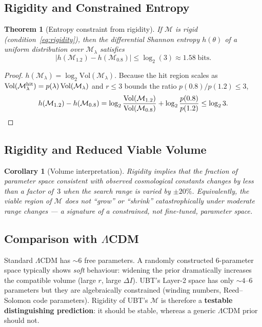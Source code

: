 \documentclass[12pt]{article}
\newtheorem{theorem}{Theorem}[section]
\newtheorem{corollary}{Corollary}[section]
\newcommand{\calM}{\mathcal{M}}
\begin{document}
\subsection{Rigidity and Constrained Entropy}

\begin{theorem}[Entropy constraint from rigidity]
\label{thm:entropy_constraint}
If $\calM$ is rigid (condition~\eqref{eq:rigidity}), then the differential
Shannon entropy $h(\theta)$ of a uniform distribution over $\calM_\lambda$ satisfies
\[
  |h(\calM_{1.2}) - h(\calM_{0.8})| \leq \log_2(3) \approx 1.58\;\text{bits}.
\]
\end{theorem}

\begin{proof}
$h(\calM_\lambda) = \log_2\mathrm{Vol}(\calM_\lambda)$.
Because the hit region scales as $\mathrm{Vol}(\calM_\lambda^{\rm hit})
= p(\lambda)\,\mathrm{Vol}(\calM_\lambda)$ and $r\leq 3$ bounds the ratio
$p(0.8)/p(1.2)\leq 3$,
\[
  h(\calM_{1.2}) - h(\calM_{0.8})
  = \log_2\frac{\mathrm{Vol}(\calM_{1.2})}{\mathrm{Vol}(\calM_{0.8})}
    + \log_2\frac{p(0.8)}{p(1.2)}
  \leq \log_2 3. \qedhere
\]
\end{proof}

\subsection{Rigidity and Reduced Viable Volume}

\begin{corollary}[Volume interpretation]
\label{cor:volume}
Rigidity implies that the \emph{fraction} of parameter space consistent with
observed cosmological constants changes by less than a factor of~$3$ when the
search range is varied by $\pm 20\%$.  Equivalently, the viable region of $\calM$
does not ``grow'' or ``shrink'' catastrophically under moderate range changes — a
signature of a \emph{constrained, not fine-tuned}, parameter space.
\end{corollary}

\subsection{Comparison with $\Lambda$CDM}

Standard $\Lambda$CDM has $\sim 6$ free parameters.  A randomly constructed
6-parameter space typically shows \emph{soft} behaviour: widening the prior
dramatically increases the compatible volume (large $r$, large $\Delta I$).
UBT's Layer-2 space has only $\sim 4$--6 parameters but they are algebraically
constrained (winding numbers, Reed--Solomon code parameters).
Rigidity of UBT's $\calM$ is therefore a \textbf{testable distinguishing
prediction}: it should be stable, whereas a generic $\Lambda$CDM prior should not.
\end{document}
